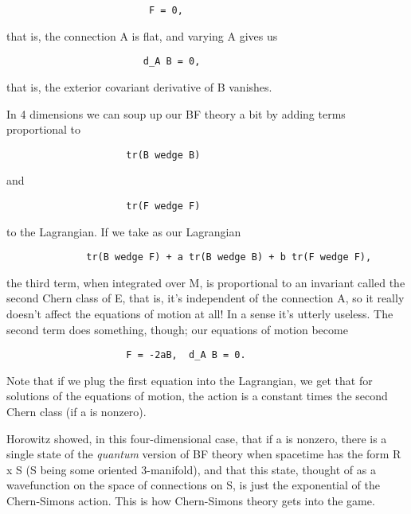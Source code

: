 \begin{verbatim}
                         F = 0,
\end{verbatim}
    

that is, the connection A is flat, and varying A gives us

\begin{verbatim}
                        d_A B = 0,
\end{verbatim}
    

that is, the exterior covariant derivative of B vanishes.  

In 4 dimensions we can soup up our BF theory a bit by adding terms
proportional to

\begin{verbatim}
                     tr(B wedge B)
\end{verbatim}
    
and

\begin{verbatim}
                     tr(F wedge F) 
\end{verbatim}
    

to the Lagrangian.  If we take as our Lagrangian

\begin{verbatim}
              tr(B wedge F) + a tr(B wedge B) + b tr(F wedge F), 
\end{verbatim}
    
        
the third term, when integrated over M, is proportional to an invariant
called the second Chern class of E, that is, it's independent of the
connection A, so it really doesn't affect the equations of motion at
all!  In a sense it's utterly useless.  The second term does something,
though; our equations of motion become

\begin{verbatim}
                     F = -2aB,  d_A B = 0.
\end{verbatim}
    

Note that if we plug the first equation into the Lagrangian, we get that
for solutions of the equations of motion, the action is a constant times
the second Chern class (if a is nonzero).  

Horowitz showed, in this four-dimensional case, that if a is nonzero, 
there is a single state of the \emph{quantum} version of BF theory when
spacetime has the form R x S (S being some oriented 3-manifold), and
that this state, thought of as a wavefunction on the space of
connections on S, is just the exponential of the Chern-Simons action.  
This is how Chern-Simons theory gets into the game.  

